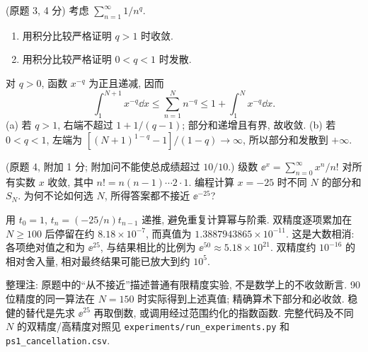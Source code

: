 \begin{exercise}\label{ps1-q3}
(原题 3, 4 分) 考虑 $\sum_{n=1}^{\infty}1/n^q$.
\begin{enumerate}[label=(\alph*)]
\item 用积分比较严格证明 $q>1$ 时收敛.
\item 用积分比较严格证明 $0<q<1$ 时发散.
\end{enumerate}
\end{exercise}
\begin{solution}
对 $q>0$, 函数 $x^{-q}$ 为正且递减, 因而
\[
\int_1^{N+1}x^{-q}\dd x\le\sum_{n=1}^N n^{-q}
\le1+\int_1^N x^{-q}\dd x.
\]
(a) 若 $q>1$, 右端不超过 $1+1/(q-1)$; 部分和递增且有界, 故收敛.
(b) 若 $0<q<1$, 左端为 $[(N+1)^{1-q}-1]/(1-q)\to\infty$, 所以部分和发散到 $+\infty$.
\end{solution}

\begin{exercise}\label{ps1-q4}
(原题 4, 附加 1 分; 附加问不能使总成绩超过 $10/10$.) 级数
$\ee^x=\sum_{n=0}^{\infty}x^n/n!$ 对所有实数 $x$ 收敛, 其中
$n!=n(n-1)\cdots2\cdot1$.
编程计算 $x=-25$ 时不同 $N$ 的部分和 $S_N$. 为何不论如何选 $N$, 所得答案都不接近 $\ee^{-25}$?
\end{exercise}
\begin{solution}
用 $t_0=1$, $t_n=(-25/n)t_{n-1}$ 递推, 避免重复计算幂与阶乘. 双精度逐项累加在 $N\ge100$ 后停留在约 $8.18\times10^{-7}$, 而真值为 $1.3887943865\times10^{-11}$. 这是大数相消: 各项绝对值之和为 $\ee^{25}$, 与结果相比的比例为 $\ee^{50}\approx5.18\times10^{21}$. 双精度约 $10^{-16}$ 的相对舍入量, 相对最终结果可能已放大到约 $10^5$.

整理注: 原题中的“从不接近”描述普通有限精度实验, 不是数学上的不收敛断言. 90 位精度的同一算法在 $N=150$ 时实际得到上述真值; 精确算术下部分和必收敛. 稳健的替代是先求 $\ee^{25}$ 再取倒数, 或调用经过范围约化的指数函数. 完整代码及不同 $N$ 的双精度/高精度对照见 \texttt{experiments/run\_experiments.py} 和 \texttt{ps1\_cancellation.csv}.
\end{solution}
